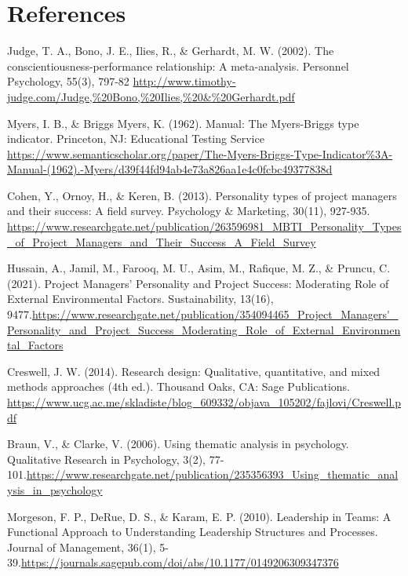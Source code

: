 \section{References}

    \begin{enumerate}[label={[\arabic*]}]
    
        
        \item Judge, T. A., Bono, J. E., Ilies, R., \& Gerhardt, M. W. (2002). The conscientiousness-performance relationship: A meta-analysis. Personnel Psychology, 55(3), 797-82 \url{http://www.timothy-judge.com/Judge,%20Bono,%20Ilies,%20&%20Gerhardt.pdf}

        \item Myers, I. B., \& Briggs Myers, K. (1962). Manual: The Myers-Briggs type indicator. Princeton, NJ: Educational Testing Service \url{https://www.semanticscholar.org/paper/The-Myers-Briggs-Type-Indicator%3A-Manual-(1962).-Myers/d39f44fd94ab4e73a826aa1e4c0fcbc49377838d}

        \item \label{itm:third} Cohen, Y., Ornoy, H., \& Keren, B. (2013). Personality types of project managers and their success: A field survey. Psychology \& Marketing, 30(11), 927-935. \url{https://www.researchgate.net/publication/263596981_MBTI_Personality_Types_of_Project_Managers_and_Their_Success_A_Field_Survey}

        \item \label{itm:fourth} Hussain, A., Jamil, M., Farooq, M. U., Asim, M., Rafique, M. Z., \& Pruncu, C. (2021). Project Managers’ Personality and Project Success: Moderating Role of External Environmental Factors. Sustainability, 13(16), 9477.\url{https://www.researchgate.net/publication/354094465_Project_Managers'_Personality_and_Project_Success_Moderating_Role_of_External_Environmental_Factors}

        \item \label{itm:fifth} Creswell, J. W. (2014). Research design: Qualitative, quantitative, and mixed methods approaches (4th ed.). Thousand Oaks, CA: Sage Publications. \url{https://www.ucg.ac.me/skladiste/blog_609332/objava_105202/fajlovi/Creswell.pdf}

        \item \label{itm:sixth} Braun, V., \& Clarke, V. (2006). Using thematic analysis in psychology. Qualitative Research in Psychology, 3(2), 77-101.\url{https://www.researchgate.net/publication/235356393_Using_thematic_analysis_in_psychology}

         \item \label{itm:seventh}Morgeson, F. P., DeRue, D. S., \& Karam, E. P. (2010). Leadership in Teams: A Functional Approach to Understanding Leadership Structures and Processes. Journal of Management, 36(1), 5-39.\url{https://journals.sagepub.com/doi/abs/10.1177/0149206309347376}
  
    \end{enumerate}